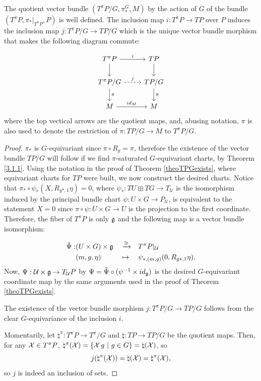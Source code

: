 \begin{theorem}\label{theoTpiPGSubbundle}
The quotient vector bundle $(T^\pi P/G, \pi^G_*, M)$ by the action of $G$ of the bundle $(T^\pi P, \pi_*|_{T^\pi P}, P)$ is well defined. The inclusion map $i: T^\pi P \to TP$ over $P$ induces the inclusion map $j: T^\pi P/G \to TP/G$ which is the unique vector bundle morphism that makes the following diagram commute:

\begin{equation}
    \begin{tikzcd}
        T^\pi P \ar{r}{i} \ar{d} & TP \ar{d} \\
        T^\pi P/G \ar[dashed]{r}{j} \arrow{d}{\pi} & TP/G \arrow{d}{\pi} \\
        M \arrow{r}{id_M} & M
    \end{tikzcd}
\end{equation}
where the top vectical arrows are the quotient maps, and, abusing notation, $\pi$ is also used to denote the restriction of $\pi: TP/G \to M$ to $T^\pi P/G$.
\end{theorem}

\begin{proof}
$\pi_*$ is $G$-equivariant since $\pi \circ R_g = \pi$, therefore the existence of the vector bundle $TP/G$ will follow if we find $\pi$-saturated $G$-equivariant charts, by Theorem \ref{3.1.1}. Using the notation in the proof of Theorem \ref{theoTPGexists}, where equivariant charts for $TP$ were built, we now construct the desired charts. Notice that $\pi_* \circ \psi_* (X, R_{g*, 1} \eta) = 0$, where $\psi_* : TU \boxplus TG \to T_{\mathcal U}$ is the isomorphism induced by the principal bundle chart $\psi: U \times G \to P_{\mathcal U}$, is equivalent to the statement $X = 0$ since $\pi \circ \psi: U \times G \to U$ is the projection to the first coordinate. Therefore, the fiber of $T^\pi P$ is only $\mathfrak{g}$ and the following map is a vector bundle isomorphism:

\begin{align*}
    \Tilde \Psi :& (U \times G) \times \mathfrak{g} && \xrightarrow{\cong} && T^\pi P|_{\mathcal U} \\    
                 & (m, g, \eta)&& \mapsto &&\psi_{*, (m, g)}(0, R_{g*, 1} \eta).
\end{align*}
Now, $\Psi : \mathcal U \times \mathfrak{g}  \to  T_{\mathcal U}P$ by $\Psi = \Tilde \Psi \circ (\psi^{-1} \times id_{\mathfrak{g}})$ is the desired $G$-equivariant coordinate map by the same arguments used in the proof of Theorem \ref{theoTPGexists}.

The existence of the vector bundle morphism $j: T^\pi P/G \to TP/G$ follows from the clear $G$-equivariance of the inclusion $i$.

Momentarily, let $\natural^\pi: T^\pi P \to T^\pi/G$ and $\natural: TP \to TP/G$ be the quotient maps. Then, for any $\mathcal{X} \in T^\pi P$, $\natural^\pi(\mathcal{X}) = \left\{ \mathcal{X} \, g \ |\  g \in G \right\} = \natural(\mathcal{X})$, so \[j(\natural^\pi(\mathcal{X})) = \natural(\mathcal{X}) = \natural^\pi(\mathcal{X}),\] so $j$ is indeed an inclusion of sets.
\end{proof}

